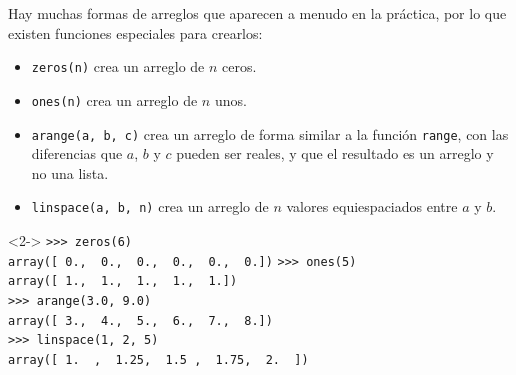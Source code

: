 \begin{frame}[fragile]
Hay muchas formas de arreglos que aparecen a menudo en la pr\'{a}ctica, por lo que existen funciones especiales para crearlos:
\begin{itemize}[<+->]
\item \texttt{zeros(n)} crea un arreglo de $n$ ceros.
\item \texttt{ones(n)} crea un arreglo de $n$ unos.
\item \texttt{arange(a, b, c)} crea un arreglo de forma similar a la funci\'{o}n \texttt{range}, con las diferencias que $a$, $b$ y $c$ pueden ser reales, y que el resultado es un arreglo y no una lista.
\item \texttt{linspace(a, b, n)} crea un arreglo de $n$ valores equiespaciados entre $a$ y $b$.
\end{itemize}
\end{frame}
\begin{frame}[fragile]
\begin{exampleblock}{}<2->
\verb|>>> zeros(6)| \\
\pause
\verb|array([ 0.,  0.,  0.,  0.,  0.,  0.])|
\pause
\verb|>>> ones(5)| \\
\pause
\verb|array([ 1.,  1.,  1.,  1.,  1.])| \\
\pause
\verb|>>> arange(3.0, 9.0)| \\
\pause
\verb|array([ 3.,  4.,  5.,  6.,  7.,  8.])|\\
\pause
\verb|>>> linspace(1, 2, 5)| \\
\pause
\verb|array([ 1.  ,  1.25,  1.5 ,  1.75,  2.  ])|
\end{exampleblock}
\end{frame}
